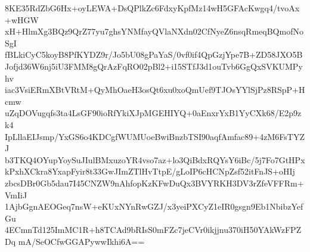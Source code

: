 8KE35RdZbG6Hx+oyLEWA+DsQPlkZc6FdxyKpfMz14wH5GFAcKwgq4/tvoAx+wHGW
xH+HlmXg3BQz9QrZ77yu7ghsYNMfayQVlaNXdn02CfNyeZ6nsqRmeqBQmofNoSgI
fBLkiCyC5koyB8PfKYDZ9r/Jo5bU08gPaYaS/0vf0if4QpGzjYpe7B+ZD58JXO5B
Jofjd36W6nj5iU3FMM8gQrAzFqRO02pBl2+i15STfJ3d1ouTvb6GgQxSVKUMPyhv
iac3VsiERmXBtVRtM+QyMhOaeH3osQt6xu0xoQmUef9TJOsYYlSjPz8RSpP+Hcmw
uZqDOVugqfs3ta4LsGF90ioRfYkiXJpMGEHIYQ+0aEnxrYxB1YyCXk68/E2p9zk4
IpLllaEIJsmp/YxGS6o4KDCgfWUMUoeBwiBnzbTSI90aqfAmfac89+4zM6FsTYZJ
b3TKQ4OYupYoySuJIulBMxuzoYR4vso7az+lo3QiBdxRQYsY6iBc/5j7Fo7GtHPx
kPxhXCkra8YxapFyir8t33GwJImZTlHvTtpE/gLoIP6cHCNpZsf52itFnJS+oHIj
zbcsDBr0Gb5dau7I45CNZW9nAhfopKzKFwDuQx3BVYRKH3DV3rZfeVFFRm+VmIiJ
1AjbGgnAEOGeq7nsW+eKUxNYnRwGZJ/x3yeiPXCyZ1eIR0gsgn9Eb1NbibzYefGu
4ECmnTd125ImMC1R+h8TCAd9bRIsS0mFZc7jeCVr0ikjjnu370iH50YAkWzFPZDq
mA/SeOCfwGGAPywwIkhi6A==
